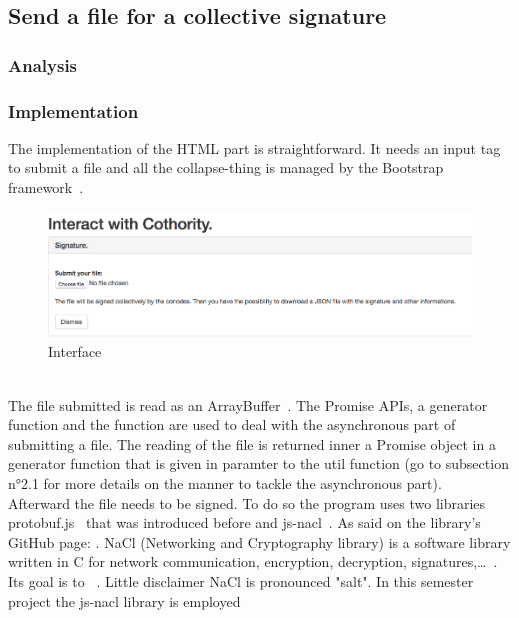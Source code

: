 \documentclass[11pt, a4paper, twoside, openright]{book} %
\begin{document}
\subsection{Send a file for a collective signature}
\subsubsection{Analysis}

\subsubsection{Implementation}
The implementation of the HTML part is straightforward. It needs an input tag to
submit a file and all the collapse-thing is managed by the Bootstrap framework~\cite{bootstrap}.\\

\begin{figure}[ht!]
\centering
\includegraphics[width=125mm]{verification_signature.jpg}
\caption{Interface}
\end{figure}
\leavevmode \\

The file submitted is read as an ArrayBuffer~\cite{ArrayBuffer}. The Promise APIs,
a generator function and the  function are used to deal with
the asynchronous part of submitting a file. The reading of the file is returned
inner a Promise object in a generator function that is given in paramter to the
 util function (go to subsection n°2.1 for more details on
the manner to tackle the asynchronous part).\\ %

Afterward the file needs to be signed. To do so the program uses two libraries
protobuf.js~\cite{protobufjs} that was introduced before and js-nacl~\cite{jsnacl}.
As said on the library's GitHub page: .
NaCl (Networking and Cryptography library) is a software library written in C for
network communication, encryption, decryption, signatures,\ldots~\cite{nacl}. Its
goal is to ~\cite{nacl}.
Little disclaimer NaCl is pronounced "salt".
In this semester project the js-nacl library is employed %
\end{document}

